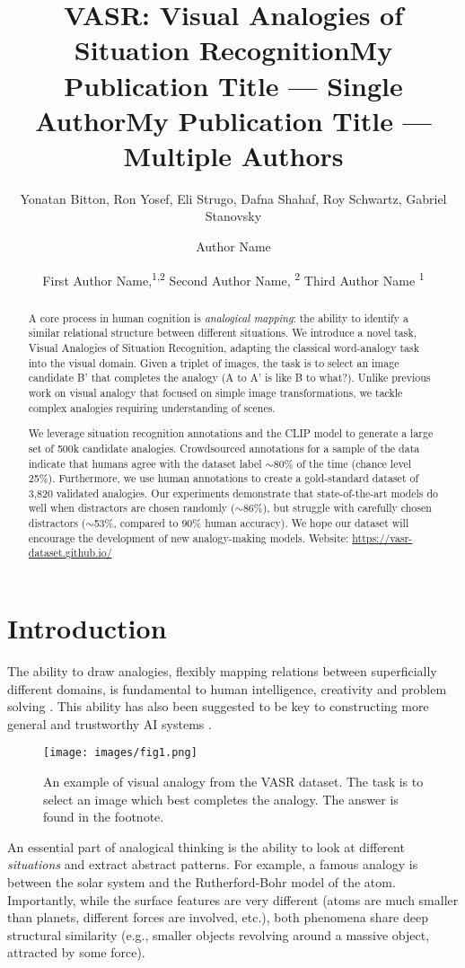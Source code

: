 \documentclass[letterpaper]{article} \usepackage{aaai23}  \usepackage{times}  \usepackage{helvet}  \usepackage{courier}  \usepackage[hyphens]{url}  \usepackage{graphicx} \urlstyle{rm} \def\UrlFont{\rm}  \usepackage{natbib}  \usepackage{caption} \frenchspacing  \setlength{\pdfpagewidth}{8.5in}  \setlength{\pdfpageheight}{11in}  \usepackage{algorithm}
\title{VASR: Visual Analogies of Situation Recognition}
\author {
Yonatan Bitton,
    Ron Yosef, 
    Eli Strugo,
    Dafna Shahaf,
    Roy Schwartz,
    Gabriel Stanovsky
}
\title{My Publication Title --- Single Author}
\author {
    Author Name
}
\title{My Publication Title --- Multiple Authors}
\author {
First Author Name,\textsuperscript{\rm 1,\rm 2}
    Second Author Name, \textsuperscript{\rm 2}
    Third Author Name \textsuperscript{\rm 1}
}
\begin{document}
\maketitle

\begin{abstract}
A core process in human cognition is \emph{analogical mapping}: the ability to identify a similar relational structure between different situations.
We introduce a novel task, Visual Analogies of Situation Recognition, adapting the classical word-analogy task into the visual domain. Given a triplet of images, the task is to select an image candidate B' that completes the analogy (A to A' is like B to what?). Unlike previous work on visual analogy that focused on simple image transformations, we tackle complex analogies requiring understanding of scenes. 

We leverage situation recognition annotations and the CLIP model to generate a large set of 500k candidate analogies. Crowdsourced  annotations for a sample of the data indicate that humans agree with the dataset label $\sim$80\% of the time (chance level 25\%). Furthermore, we use human annotations to create a gold-standard dataset of 3,820 validated analogies.
Our experiments demonstrate that state-of-the-art models do well when distractors are chosen randomly ($\sim$86\%), but struggle with carefully chosen distractors ($\sim$53\%, compared to 90\% human accuracy). We hope our dataset will encourage the development of new analogy-making models. Website: \url{https://vasr-dataset.github.io/}
\end{abstract}

\section{Introduction}
The ability to draw analogies, flexibly mapping relations between superficially different domains, is fundamental to human intelligence, creativity and problem solving \cite{hofstadter2013surfaces,depeweg2018solving,goodman2014concepts,fauconnier1997mappings,gentner2001analogical,carey2011precis,spelke2007core}. This ability has also been suggested to be key to constructing more general and trustworthy AI systems \cite{mitchell2021abstraction,mccarthy2006proposal}. 
\begin{figure}[!tb]
\centering
\newcommand{\figlen}[0]{\columnwidth}
    \texttt{[image: images/fig1.png]}\\
    \caption{An example of visual analogy from the VASR dataset. The task is to select an image which best completes the analogy. The answer is found in the footnote.}
    \label{fig:fig1}
\end{figure}
An essential part of analogical thinking is the ability to 
look at different \emph{situations} and extract abstract patterns. For example, a famous analogy is between the solar system and the Rutherford-Bohr model of the
atom. Importantly, while the surface features are very different (atoms are much smaller than planets, different forces are involved, etc.), both phenomena share deep structural similarity (e.g., smaller objects revolving around a massive object, attracted by some force).
\end{document}
